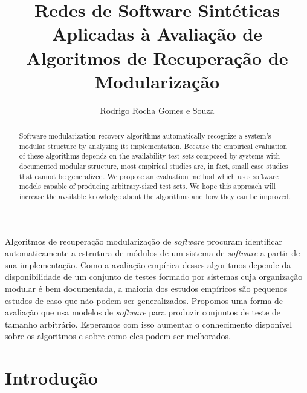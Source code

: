 \documentclass[12pt]{article}
\title{Redes de Software Sintéticas Aplicadas à Avaliação de Algoritmos de
Recuperação de Modularização}
\author{Rodrigo Rocha Gomes e Souza\inst{1}
}
\begin{document}
 

\maketitle

\begin{abstract} 

Software modularization recovery algorithms automatically recognize a system's
modular structure by analyzing its implementation. Because the empirical
evaluation of these algorithms depends on the availability test sets composed by
systems with documented modular structure, most empirical studies are, in fact,
small case studies that cannot be generalized. We propose an evaluation method
which uses software models capable of producing arbitrary-sized test sets. We
hope this approach will increase the available knowledge about the algorithms
and how they can be improved.

\end{abstract}
     
\begin{resumo} 

Algoritmos de recuperação modularização de \emph{software} procuram identificar
automaticamente a estrutura de módulos de um sistema de \emph{software} a partir
de sua implementação. Como a avaliação empírica desses algoritmos depende da
disponibilidade de um conjunto de testes formado por sistemas cuja organização
modular é bem documentada, a maioria dos estudos empíricos são pequenos estudos
de caso que não podem ser generalizados.  Propomos uma forma de avaliação que
usa modelos de \emph{software} para produzir conjuntos de teste de tamanho
arbitrário.  Esperamos com isso aumentar o conhecimento disponível sobre os
algoritmos e sobre como eles podem ser melhorados.

\end{resumo}

\section{Introdução}
\end{document}
